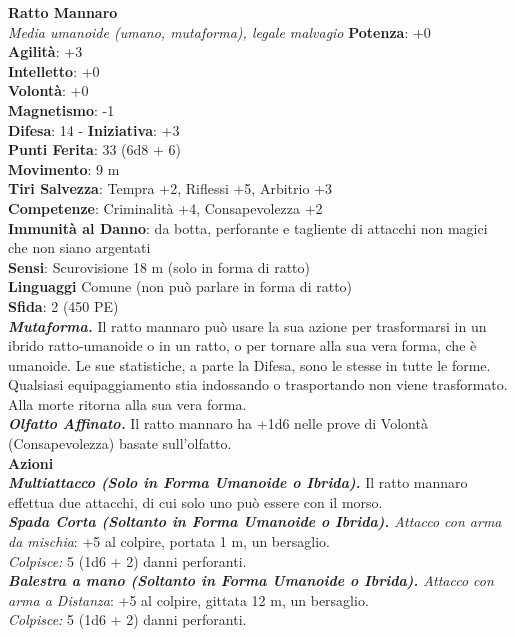 \begin{multicols}{2}
\medskip\textbf{Ratto Mannaro}\\
\emph{Media umanoide (umano, mutaforma), legale malvagio}
\textbf{Potenza}: +0\\
\textbf{Agilità}: +3\\
\textbf{Intelletto}: +0\\
\textbf{Volontà}: +0\\
\textbf{Magnetismo}: -1\\
\textbf{Difesa}: 14 - \textbf{Iniziativa}: +3\\
\textbf{Punti Ferita}: 33 (6d8 + 6)\\
\textbf{Movimento}: 9 m\\
\textbf{Tiri Salvezza}: Tempra +2, Riflessi +5, Arbitrio +3\\
\textbf{Competenze}: Criminalità +4, Consapevolezza +2\\
\textbf{Immunità al Danno}: da botta, perforante e tagliente di attacchi non magici che non siano argentati\\
\textbf{Sensi}: Scurovisione 18 m (solo in forma di ratto)\\
\textbf{Linguaggi} Comune (non può parlare in forma di ratto)\\
\textbf{Sfida}: 2 (450 PE)\smallskip\\
\emph{\textbf{Mutaforma.}} Il ratto mannaro può usare la sua azione per trasformarsi in un ibrido ratto-umanoide o in un ratto, o per tornare alla sua vera forma, che è umanoide. Le sue statistiche, a parte la Difesa, sono le stesse in tutte le forme. Qualsiasi equipaggiamento stia indossando o trasportando non viene trasformato. Alla morte ritorna alla sua vera forma.\\
\emph{\textbf{Olfatto Affinato.}} Il ratto mannaro ha +1d6 nelle prove di Volontà (Consapevolezza) basate sull'olfatto.\\
\smallskip\textbf{Azioni}\\

\emph{\textbf{Multiattacco (Solo in Forma Umanoide o Ibrida).}} Il ratto mannaro effettua due attacchi, di cui solo uno può essere con il morso.\\
\emph{\textbf{Spada Corta (Soltanto in Forma Umanoide o Ibrida).} Attacco con arma da mischia}: +5 al colpire, portata 1 m, un bersaglio.\\
\emph{Colpisce:} 5 (1d6 + 2) danni perforanti.\\

\emph{\textbf{Balestra a mano (Soltanto in Forma Umanoide o Ibrida).} Attacco con arma a Distanza}: +5 al colpire, gittata 12 m, un bersaglio.\\
\emph{Colpisce:} 5 (1d6 + 2) danni perforanti.\\


\end{multicols}
